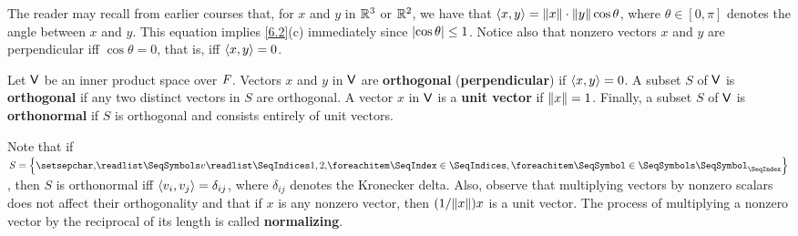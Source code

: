 \begin{note}
  The reader may recall from earlier courses that, for \(x\) and \(y\) in \(\mathbb{R}^3\) or \(\mathbb{R}^2\), we have that \(\left\langle x, y\right\rangle = \left\lVert x\right\rVert \cdot \left\lVert y\right\rVert \cos \theta\), where \(\theta \in [0, \pi]\) denotes the angle between \(x\) and \(y\).
  This equation implies \cref{6.2}(c) immediately since \(\left\lvert\cos \theta\right\rvert \leq 1\).
  Notice also that nonzero vectors \(x\) and \(y\) are perpendicular iff \(\cos \theta = 0\), that is, iff \(\left\langle x, y\right\rangle = 0\).
\end{note}

\begin{defn}\label{6.1.12}
  Let \(\mathsf{V}\) be an inner product space over \(\mathit{F}\).
  Vectors \(x\) and \(y\) in \(\mathsf{V}\) are \textbf{orthogonal} (\textbf{perpendicular}) if \(\left\langle x, y\right\rangle = 0\).
  A subset \(S\) of \(\mathsf{V}\) is \textbf{orthogonal} if any two distinct vectors in \(S\) are orthogonal.
  A vector \(x\) in \(\mathsf{V}\) is a \textbf{unit vector} if \(\left\lVert x\right\rVert = 1\).
  Finally, a subset \(S\) of \(\mathsf{V}\) is \textbf{orthonormal} if \(S\) is orthogonal and consists entirely of unit vectors.

  Note that if \(S = \set{\seq{v}{1,2,}}\), then \(S\) is orthonormal iff \(\left\langle v_i, v_j\right\rangle = \delta_{i j}\), where \(\delta_{i j}\) denotes the Kronecker delta.
  Also, observe that multiplying vectors by nonzero scalars does not affect their orthogonality and that if \(x\) is any nonzero vector, then \((1 / \norm{x}) x\) is a unit vector.
  The process of multiplying a nonzero vector by the reciprocal of its length is called \textbf{normalizing}.
\end{defn}

